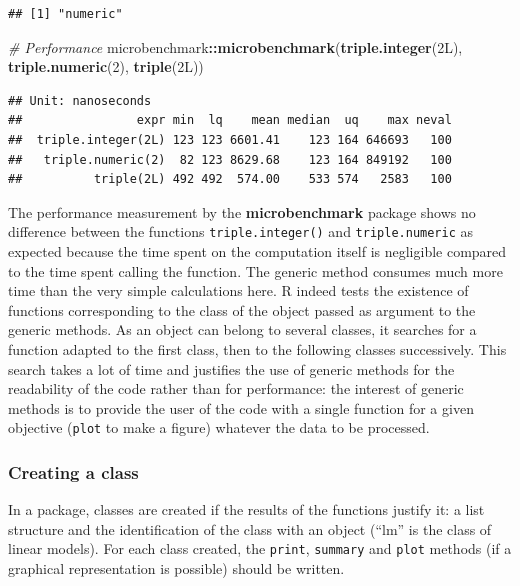 \documentclass[
  12pt,
  american,
  a4paper,
  extrafontsizes,onecolumn,openright
  ]{memoir}
\newenvironment{Shaded}{\begin{snugshade}}{\end{snugshade}}
\newcommand{\CommentTok}[1]{\textcolor[rgb]{0.56,0.35,0.01}{\textit{#1}}}
\newcommand{\DataTypeTok}[1]{\textcolor[rgb]{0.13,0.29,0.53}{#1}}
\newcommand{\DecValTok}[1]{\textcolor[rgb]{0.00,0.00,0.81}{#1}}
\newcommand{\FunctionTok}[1]{\textcolor[rgb]{0.13,0.29,0.53}{\textbf{#1}}}
\newcommand{\NormalTok}[1]{#1}
\newcommand{\SpecialCharTok}[1]{\textcolor[rgb]{0.81,0.36,0.00}{\textbf{#1}}}
\newlength{\rf}
\begin{document}
\begin{verbatim}
## [1] "numeric"
\end{verbatim}

\begin{Shaded}
\begin{Highlighting}[]
\CommentTok{\# Performance}
\NormalTok{microbenchmark}\SpecialCharTok{::}\FunctionTok{microbenchmark}\NormalTok{(}\FunctionTok{triple.integer}\NormalTok{(}\DecValTok{2}\DataTypeTok{L}\NormalTok{), }\FunctionTok{triple.numeric}\NormalTok{(}\DecValTok{2}\NormalTok{),}
    \FunctionTok{triple}\NormalTok{(}\DecValTok{2}\DataTypeTok{L}\NormalTok{))}
\end{Highlighting}
\end{Shaded}

\begin{verbatim}
## Unit: nanoseconds
##                expr min  lq    mean median  uq    max neval
##  triple.integer(2L) 123 123 6601.41    123 164 646693   100
##   triple.numeric(2)  82 123 8629.68    123 164 849192   100
##          triple(2L) 492 492  574.00    533 574   2583   100
\end{verbatim}

\normalsize

The performance measurement by the \textbf{microbenchmark} package shows no difference between the functions \texttt{triple.integer()} and \texttt{triple.numeric} as expected because the time spent on the computation itself is negligible compared to the time spent calling the function.
The generic method consumes much more time than the very simple calculations here.
R indeed tests the existence of functions corresponding to the class of the object passed as argument to the generic methods.
As an object can belong to several classes, it searches for a function adapted to the first class, then to the following classes successively.
This search takes a lot of time and justifies the use of generic methods for the readability of the code rather than for performance: the interest of generic methods is to provide the user of the code with a single function for a given objective (\texttt{plot} to make a figure) whatever the data to be processed.

\subsubsection{Creating a class}\label{creating-a-class}

In a package, classes are created if the results of the functions justify it: a list structure and the identification of the class with an object (\enquote{lm} is the class of linear models).
For each class created, the \texttt{print}, \texttt{summary} and \texttt{plot} methods (if a graphical representation is possible) should be written.
\end{document}
